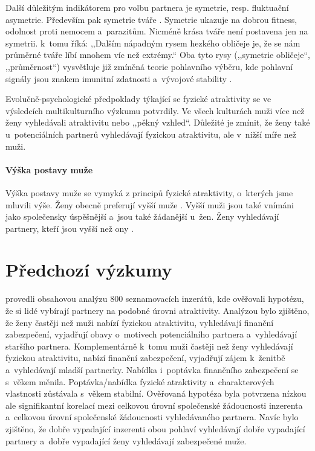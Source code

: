 \documentclass[a4paper, 12pt, notitlepage, oneside, numbers=noenddot]{report}
\begin{document}
Další důležitým indikátorem pro volbu partnera je symetrie,
resp. fluktuační asymetrie. Především pak symetrie tváře
\citep{Ridley2007}.  Symetrie ukazuje na dobrou fitness, odolnost
proti nemocem a~parazitům.  Nicméně krása tváře není postavena jen na
symetrii. \citet{Ridley2007} k~tomu říká: ,,Dalším nápadným rysem
hezkého obličeje je, že se nám průměrné tváře líbí mnohem víc než
extrémy.`` Oba tyto rysy (,,symetrie obličeje``, ,,průměrnost``)
vysvětluje již zmíněná teorie pohlavního výběru, kde pohlavní signály
jsou znakem imunitní zdatnosti a~vývojové stability \citep{Barber1995}.

Evolučně-psychologické předpoklady týkající se fyzické atraktivity se
ve výsledcích multikulturního výzkumu potvrdily.  Ve všech kulturách
muži více než ženy vyhledávali atraktivitu nebo ,,pěkný vzhled``.
Důležité je zmínit, že ženy také u~potenciálních partnerů
vyhledávají fyzickou atraktivitu, ale v~nižší míře než muži.

\paragraph{Výška postavy muže}

Výška postavy muže se vymyká z principů fyzické atraktivity, o~kterých
jsme mluvili výše.  Ženy obecně preferují vyšší muže
\citep{Barber1995, Ridley2007}.  Vyšší muži jsou také vnímáni jako
společensky úspěšnější a~jsou také žádanější u~žen. Ženy vyhledávají
partnery, kteří jsou vyšší než ony \citep{Barber1995}.

\section{Předchozí výzkumy}
\citet{HarrisonSaeed1977} provedli obsahovou analýzu 800 seznamovacích
inzerátů, kde ověřovali hypotézu, že si lidé vybírají partnery na
podobné úrovni atraktivity. Analýzou bylo zjištěno, že ženy častěji
než muži nabízí fyzickou atraktivitu, vyhledávají finanční
zabezpečení, vyjadřují obavy o~motivech potenciálního partnera
a~vyhledávají staršího partnera. Komplementárně k~tomu muži častěji
než ženy vyhledávají fyzickou atraktivitu, nabízí finanční
zabezpečení, vyjadřují zájem k~ženitbě a~vyhledávají mladší
partnerky. Nabídka i~poptávka finančního zabezpečení se s~věkem
měnila. Poptávka/nabídka fy\-zické atraktivity a~charakterových
vlastnosti zůstávala s~věkem stabilní.  Ověřovaná hypotéza byla
potvrzena nízkou ale signifikantní korelací mezi celkovou úrovní
společenské žádoucnosti inzerenta a~celkovou úrovní společenské
žádoucnosti vyhledávaného partnera. Navíc bylo zjištěno, že dobře
vypadající inzerenti obou pohlaví vyhledávají dobře vypadající
partnery a~dobře vypadající ženy vyhledávají zabezpečené muže.
\end{document}

